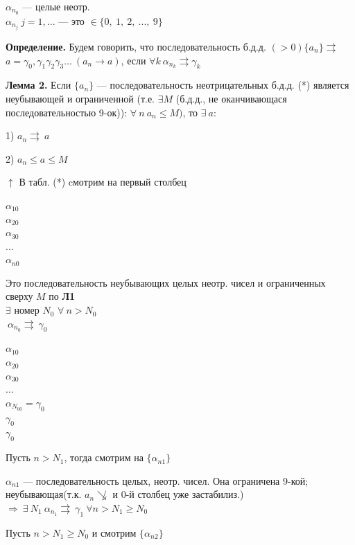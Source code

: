 \documentclass{article}
\begin{document}
    \(\alpha_{n_0}\) --- целые неотр.\\
    \(\alpha_{n_j}\  j = 1, ...\) --- это \(\in \{0,\ 1,\ 2, \ ..., \ 9\}\)

    \textbf{Определение.} Будем говорить, что последовательность б.д.д. \( (>0) \{a_n\} \rightrightarrows \)\\
    \( a = \gamma_0,\gamma_1\gamma_2\gamma_3...\ (a_n \rightarrow a) \), если \(\forall k \ \alpha_{n_k} \rightrightarrows \gamma_k\)

    \textbf{Лемма 2.} Если \( \{a_n\} \) --- последовательность неотрицательных б.д.д. (*) является неубывающей и ограниченной (т.е. \( \exists M \) (б.д.д., не оканчивающася последовательностью 9-ок)): \( \forall\ n\ a_n \leq M) \), то \( \exists\ a \):
    
    1) \(a_n \rightrightarrows\ a\)  

    2) \(a_n \leq a \leq M\)

    \( \uparrow \) В табл. (*) cмотрим на первый столбец

    \( \alpha_{10} \)\\
    \( \alpha_{20} \)\\
    \( \alpha_{30} \)\\
    ...\\
    \( \alpha_{n0} \)

    Это последовательность неубывающих целых неотр. чисел и ограниченных сверху \(M\) по \textbf{Л1}\\
    \(\exists \) номер \(N_0\) \: \(\forall\ n > N_0\)\\
    \(\ \alpha_{n_0} \rightrightarrows\ \gamma_0\)
    
    \( \alpha_{10} \)\\
    \( \alpha_{20} \)\\
    \( \alpha_{30} \)\\
    ...\\
    \( \alpha_{N_00} = \gamma_0 \)\\
    \(\gamma_0\)\\
    \(\gamma_0\)

    Пусть \(n > N_1\), тогда смотрим на \(\{\alpha_{n1}\}\)

    \(\alpha_{n1}\) --- последовательность целых, неотр. чисел. Она ограничена 9-кой; неубывающая(т.к. \(a_n \not\searrow\) и 0-й столбец уже застабилиз.) \(\Rightarrow \ \exists\ N_1 \ \alpha_{n_1} \rightrightarrows\ \gamma_1 \ \forall n > N_1 \geq N_0\)

    Пусть \( n > N_1 \geq N_0 \) и смотрим \( \{ \alpha_{n2} \} \)
    
\end{document}

